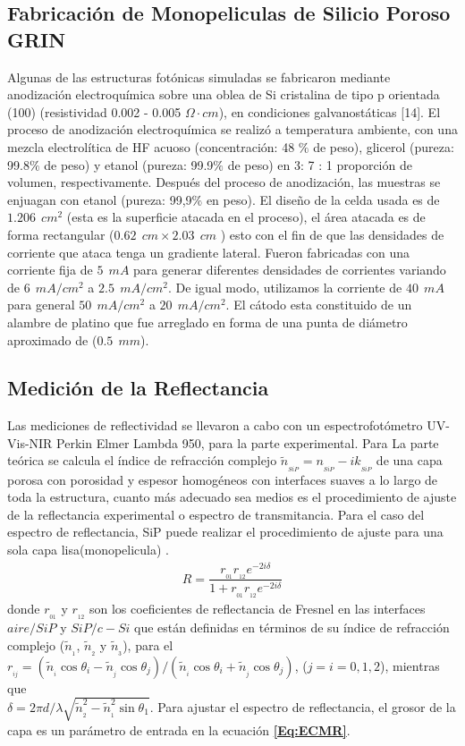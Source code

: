 \documentclass[a4paper,11pt,]{book}
\begin{document}
\subsection{Fabricación de Monopeliculas de Silicio Poroso GRIN}
Algunas de las estructuras fotónicas simuladas se fabricaron mediante  anodización electroquímica sobre una oblea de Si cristalina de tipo p orientada (100) (resistividad 0.002 - 0.005 $ \Omega \cdot cm$), en condiciones galvanostáticas [14]. El proceso de anodización electroquímica se realizó a temperatura ambiente, con una mezcla electrolítica de HF acuoso (concentración: 48 $ \% $ de peso), glicerol (pureza: 99.8$ \% $ de peso) y etanol (pureza: 99.9$ \% $ de peso) en 3: 7 : 1 proporción de volumen, respectivamente. Después del proceso de anodización, las muestras se enjuagan con etanol (pureza: 99,9$ \% $ en peso).   El diseño de la celda usada  es de $1.206\ \ cm^2$ (esta es la superficie atacada en el proceso), el área atacada es de forma rectangular ($0.62\ \ cm \times 2.03 \ \ cm$ )  esto con el fin de que las densidades de corriente que ataca tenga un gradiente lateral. Fueron fabricadas con una corriente fija de $5 \ \  mA$ para generar  diferentes densidades de corrientes variando de  $6 \ \ mA/cm^2$ a $2.5 \ \ mA/cm^2$. De igual modo, utilizamos la corriente de $40 \ \  mA$  para general   $50\ \ mA/cm^2$ a $20\ \  mA/cm^2$.   El cátodo esta constituido de un alambre de platino que fue arreglado en forma de una punta de diámetro aproximado de ($0.5\ \ mm$). 
\subsection{Medición de la Reflectancia}
Las mediciones de reflectividad se llevaron a cabo con un espectrofotómetro UV-Vis-NIR Perkin Elmer Lambda 950, para la parte experimental. Para La parte teórica  se  calcula el índice de refracción complejo $ \tilde{n}_{_{SiP}} = n_{_ {SiP}} - ik_{_{SiP}} $ de una capa porosa con porosidad y espesor homogéneos con interfaces suaves a lo largo de toda la estructura, cuanto más adecuado sea medios es el procedimiento de ajuste de la reflectancia experimental o espectro de transmitancia. Para el caso del espectro de reflectancia, SiP puede realizar el procedimiento de ajuste para una sola capa lisa(monopelicula) \cite{I17, I18, I19}.
\begin{eqnarray}\label{Eq:ECMR}
R=\dfrac{r _ {_ {01}}r _ {_ {12}} e^{-2i\delta}}{1+r _ {_ {01}}r _ {_ {12}} e^{-2i\delta}} 
\end{eqnarray}
donde $ r_{_ {01}} $ y $ r_{_ {12}} $ son los coeficientes de reflectancia de Fresnel en las interfaces $aire/SiP$ y $SiP/c-Si$ que están definidas en términos de su índice de refracción complejo ($\tilde{n}_{_ {1}} $, $\tilde{n}_{_ {2}} $ y $ \tilde{n}_{_ {3}} $), para el  $r_{_{ij}}=(\tilde{n}_{_{i}}\cos\theta_i-\tilde{n}_{_{j}}\cos\theta_j)/(\tilde{n}_{_{i}}\cos\theta_i+\tilde{n}_{_{j}}\cos\theta_j)$, ($j=i=0,1,2$), mientras que \\ $\delta=2\pi d/\lambda\sqrt{\tilde{n}^2_{_{2}}-\tilde{n}^2_{_{1}}\sin \theta_1}$. Para ajustar el espectro de reflectancia, el grosor de la capa es un parámetro de entrada en la ecuación \textbf{\ref{Eq:ECMR}}.
\end{document}
